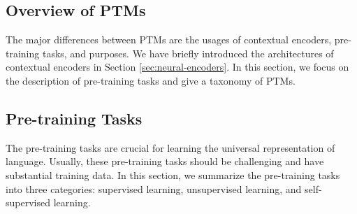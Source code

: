 \documentclass[fleqn]{SCYE-arxiv}
\begin{document}
\begin{multicols}{2}





\section{Overview of PTMs}
\label{sec:overview}

The major differences between PTMs are the usages of contextual encoders, pre-training tasks, and purposes. We have briefly introduced the architectures of contextual encoders in Section \ref{sec:neural-encoders}. In this section, we focus on the description of pre-training tasks and give a taxonomy of PTMs.





\subsection{Pre-training Tasks}
\label{sec:pre-training-tasks}

The pre-training tasks are crucial for learning the universal representation of language. Usually, these pre-training tasks should be challenging and have substantial training data. In this section, we summarize the pre-training tasks into three categories: supervised learning, unsupervised learning, and self-supervised learning.


\end{multicols}
\end{document}
